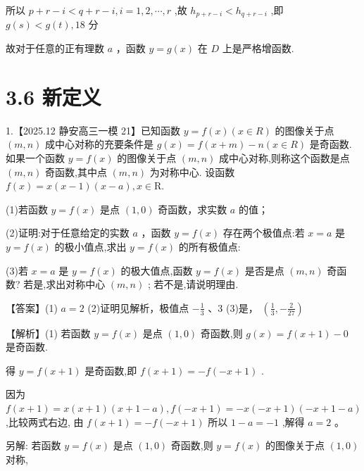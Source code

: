 \documentclass[10pt]{article}
\begin{document}
所以 \(p + r - i < q + r - i,i = 1,2,\cdots ,r\) ,故 \({h}_{p + r - i} < {h}_{q + r - i}\) ,即 \(g\left( s\right)  < g\left( t\right) ,{18}\) 分

故对于任意的正有理数 \(a\) ，函数 \(y = g\left( x\right)\) 在 \(D\) 上是严格增函数.

\section*{3.6 新定义}

1.【2025.12 静安高三一模 21】已知函数 \(y = f\left( x\right) \left( {x \in  R}\right)\) 的图像关于点 \(\left( {m,n}\right)\) 成中心对称的充要条件是 \(g\left( x\right)  = f\left( {x + m}\right)  - n\left( {x \in  R}\right)\) 是奇函数. 如果一个函数 \(y = f\left( x\right)\) 的图像关于点 \(\left( {m,n}\right)\) 成中心对称,则称这个函数是点 \(\left( {m,n}\right)\) 奇函数,其中点 \(\left( {m,n}\right)\) 为对称中心. 设函数 \(f\left( x\right)  = x\left( {x - 1}\right) \left( {x - a}\right) ,x \in  \mathrm{R}.\)

(1)若函数 \(y = f\left( x\right)\) 是点 \(\left( {1,0}\right)\) 奇函数，求实数 \(a\) 的值；

(2)证明:对于任意给定的实数 \(a\) ，函数 \(y = f\left( x\right)\) 存在两个极值点:若 \(x = a\) 是 \(y = f\left( x\right)\) 的极小值点,求出 \(y = f\left( x\right)\) 的所有极值点:

(3)若 \(x = a\) 是 \(y = f\left( x\right)\) 的极大值点,函数 \(y = f\left( x\right)\) 是否是点 \(\left( {m,n}\right)\) 奇函数? 若是,求出对称中心 \(\left( {m,n}\right)\) ; 若不是,请说明理由.

【答案】(1) \(a = 2\) (2)证明见解析，极值点 \(- \frac{1}{3}\) 、3 (3)是， \(\left( {\frac{1}{3}, - \frac{2}{27}}\right)\)

【解析】(1) 若函数 \(y = f\left( x\right)\) 是点 \(\left( {1,0}\right)\) 奇函数,则 \(g\left( x\right)  = f\left( {x + 1}\right)  - 0\) 是奇函数.

得 \(y = f\left( {x + 1}\right)\) 是奇函数,即 \(f\left( {x + 1}\right)  =  - f\left( {-x + 1}\right)\) .

因为 \(f\left( {x + 1}\right)  = x\left( {x + 1}\right) \left( {x + 1 - a}\right) ,f\left( {-x + 1}\right)  =  - x\left( {-x + 1}\right) \left( {-x + 1 - a}\right)\) ,比较两式右边, 由 \(f\left( {x + 1}\right)  =  - f\left( {-x + 1}\right)\) 所以 \(1 - a =  - 1\) ,解得 \(a = 2\) 。

另解: 若函数 \(y = f\left( x\right)\) 是点 \(\left( {1,0}\right)\) 奇函数,则 \(y = f\left( x\right)\) 的图像关于点 \(\left( {1,0}\right)\) 对称,
\end{document}
